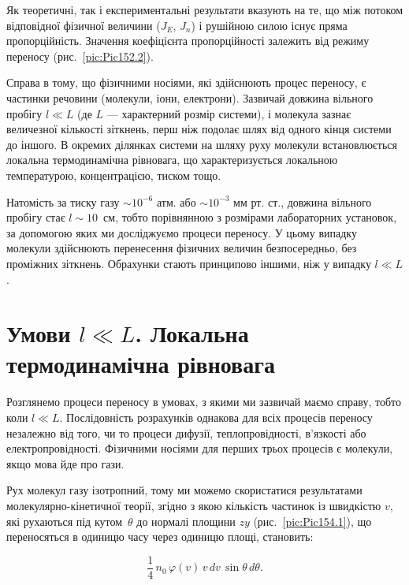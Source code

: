 Як теоретичні, так і експериментальні результати вказують на те, що між потоком
відповідної фізичної величини ($J_E$, $J_n$) і рушійною силою існує пряма
пропорційність. Значення коефіцієнта пропорційності залежить від режиму
переносу (рис.~\ref{pic:Pic152.2}).

Справа в тому, що фізичними носіями, які здійснюють процес переносу, є частинки
речовини (молекули, іони, електрони). Зазвичай довжина вільного пробігу
$l \ll L$ (де $L$ --- характерний розмір системи), і молекула зазнає величезної
кількості зіткнень, перш ніж подолає шлях від одного кінця системи до іншого.
В окремих ділянках системи на шляху руху молекули встановлюється локальна
термодинамічна рівновага, що характеризується локальною температурою,
концентрацією, тиском тощо.

Натомість за тиску газу $\sim 10^{-6}$ атм. або $\sim 10^{-3}$ мм рт. ст.,
довжина вільного пробігу стає $l \sim 10$~см, тобто порівнянною з розмірами
лабораторних установок, за допомогою яких ми досліджуємо процеси переносу.
У цьому випадку молекули здійснюють перенесення фізичних величин
безпосередньо, без проміжних зіткнень. Обрахунки стають принципово іншими,
ніж у випадку $l \ll L$.

\section{Умови \texorpdfstring{$l \ll L$}{l << L}. Локальна термодинамічна рівновага}

Розглянемо процеси переносу в умовах, з якими ми зазвичай маємо справу, тобто
коли $l \ll L$. Послідовність розрахунків однакова для всіх процесів переносу
незалежно від того, чи то процеси дифузії, теплопровідності, в’язкості або
електропровідності. Фізичними носіями для перших трьох процесів є молекули, якщо
мова йде про гази.

Рух молекул газу ізотропний, тому ми можемо скористатися результатами
молекулярно-кінетичної теорії, згідно з якою кількість частинок із швидкістю
$v$, які рухаються під кутом~$\theta$ до нормалі площини $zy$
(рис.~\ref{pic:Pic154.1}), що переносяться в одиницю часу через одиницю площі,
становить:

\begin{equation}
	\frac{1}{4}\, n_0\, \varphi(v)\, v\, dv\, \sin\theta\, d\theta.
	\label{eq:154.1}
\end{equation}

